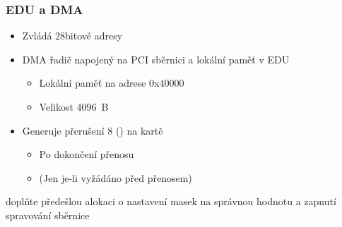 \begin{frame}
  \frametitle{EDU a DMA}

  \begin{itemize}
    \item Zvládá 28bitové adresy
    \item DMA řadič napojený na PCI sběrnici a lokální paměť v EDU
    \begin{itemize}
      \item Lokální paměť na adrese 0x40000
      \item Velikost 4096~B
    \end{itemize}

    \item Generuje přerušení 8 () na kartě
    \begin{itemize}
      \item Po dokončení přenosu
      \item (Jen je-li vyžádáno před přenosem)
    \end{itemize}
  \end{itemize}

  \pause
  \bigskip

   doplňte předešlou alokaci o nastavení masek na správnou
    hodnotu a zapnutí spravování sběrnice

\end{frame}

